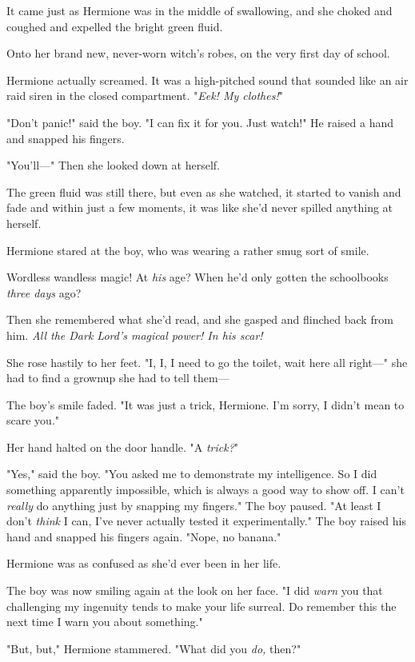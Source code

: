 It came just as Hermione was in the middle of swallowing, and she choked and
coughed and expelled the bright green fluid.

Onto her brand new, never-worn witch's robes, on the very first day of school.

Hermione actually screamed. It was a high-pitched sound that sounded like an
air raid siren in the closed compartment. "\emph{Eek! My clothes!}"

"Don't panic!" said the boy. "I can fix it for you. Just watch!" He raised a
hand and snapped his fingers.

"You'll—" Then she looked down at herself.

The green fluid was still there, but even as she watched, it started to vanish
and fade and within just a few moments, it was like she'd never spilled
anything at herself.

Hermione stared at the boy, who was wearing a rather smug sort of smile.

Wordless wandless magic! At \emph{his} age? When he'd only gotten the
schoolbooks \emph{three days} ago?

Then she remembered what she'd read, and she gasped and flinched back from him.
\emph{All the Dark Lord's magical power! In his scar!}

She rose hastily to her feet. "I, I, I need to go the toilet, wait here all
right—" she had to find a grownup she had to tell them—

The boy's smile faded. "It was just a trick, Hermione. I'm sorry, I didn't mean
to scare you."

Her hand halted on the door handle. "A \emph{trick?}"

"Yes," said the boy. "You asked me to demonstrate my intelligence. So I did
something apparently impossible, which is always a good way to show off. I
can't \emph{really} do anything just by snapping my fingers." The boy paused.
"At least I don't \emph{think} I can, I've never actually tested it
experimentally." The boy raised his hand and snapped his fingers again. "Nope,
no banana."

Hermione was as confused as she'd ever been in her life.

The boy was now smiling again at the look on her face. "I did \emph{warn} you
that challenging my ingenuity tends to make your life surreal. Do remember this
the next time I warn you about something."

"But, but," Hermione stammered. "What did you \emph{do,} then?"

